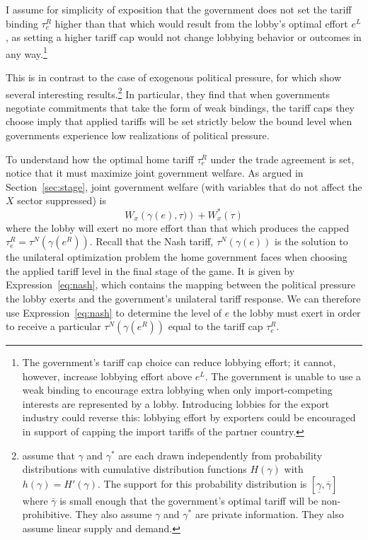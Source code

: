 \documentclass[12pt,titlepage]{article}
\newcommand{\ov}{\overline}
\newcommand{\un}{\underline}
\newcommand{\ga}{\gamma}
\begin{document}
I assume for simplicity of exposition that the government does not set the tariff binding $\tau_e^R$ higher than that which would result from the lobby's optimal effort $e^L$, as setting a higher tariff cap would not change lobbying behavior or outcomes in any way.\footnote{The government's tariff cap choice can reduce lobbying effort; it cannot, however, increase lobbying effort above $e^L$. The government is unable to use a weak binding to encourage extra lobbying when only import-competing interests are represented by a lobby. Introducing lobbies for the export industry could reverse this: lobbying effort by exporters could be encouraged in support of capping the import tariffs of the partner country.}

This is in contrast to the case of exogenous political pressure, for which \Textcite{bs2005} show several interesting results.\footnote{\Textcite{bs2005} assume that $\ga$ and $\ga^*$ are each drawn independently from probability distributions with cumulative distribution functions $H(\ga)$ with $h(\ga)=H'(\ga)$. The support for this probability distribution is $\left[\un{\ga}, \ov{\ga} \right]$ where $\ov{\ga}$ is small enough that the government's optimal tariff will be non-prohibitive. They also assume $\ga$ and $\ga^*$ are private information. They also assume linear supply and demand.} In particular, they find that when governments negotiate commitments that take the form of weak bindings, the tariff caps they choose imply that applied tariffs will be set strictly below the bound level when governments experience low realizations of political pressure.

To understand how the optimal home tariff $\tau_e^R$ under the trade agreement is set, notice that it must maximize joint government welfare. As argued in Section~\ref{sec:stage}, joint government welfare (with variables that do not affect the $X$ sector suppressed) is
  \begin{equation}
		W_x \left(\ga(e),\tau) \right) + W_x^*\left(\tau \right)
	  \label{exp:1}
	\end{equation}
where the lobby will exert no more effort than that which produces the capped $\tau_e^R=\tau^N(\ga(e^R))$. Recall that the Nash tariff, $\tau^N(\ga(e))$ is the solution to the unilateral optimization problem the home government faces when choosing the applied tariff level in the final stage of the game. It is given by Expression~\ref{eq:nash}, which contains the mapping between the political pressure the lobby exerts and the government's unilateral tariff response. We can therefore use Expression~\ref{eq:nash} to determine the level of $e$ the lobby must exert in order to receive a particular $\tau^N(\ga(e^R))$ equal to the tariff cap $\tau_e^R$.
\end{document}
